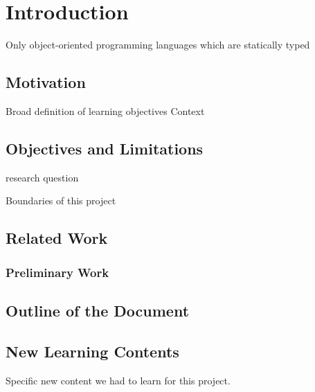 \chapter{Introduction}
Only object-oriented programming languages which are statically typed

\section{Motivation}
Broad definition of learning objectives
Context

\section{Objectives and Limitations}
research question

Boundaries of this project

\section{Related Work}
\subsection{Preliminary Work}

\section{Outline of the Document}

\section{New Learning Contents}
Specific new content we had to learn for this project.


